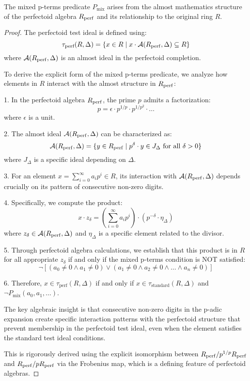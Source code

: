 \begin{theorem}\label{thm:mixed-p-terms-derivation}
The mixed p-terms predicate $P_{\text{mix}}$ arises from the almost mathematics structure of the perfectoid algebra $R_{\operatorname{perf}}$ and its relationship to the original ring $R$.
\end{theorem}

\begin{proof}
The perfectoid test ideal is defined using:
$$\tau_{\text{perf}}(R,\Delta) = \{x \in R \mid x \cdot \mathcal{A}(R_{\operatorname{perf}}, \Delta) \subseteq R\}$$
where $\mathcal{A}(R_{\operatorname{perf}}, \Delta)$ is an almost ideal in the perfectoid completion.

To derive the explicit form of the mixed p-terms predicate, we analyze how elements in $R$ interact with the almost structure in $R_{\operatorname{perf}}$:

1. In the perfectoid algebra $R_{\operatorname{perf}}$, the prime $p$ admits a factorization:
   $$p = \epsilon \cdot p^{1/p} \cdot p^{1/p^2} \cdot \ldots$$
   where $\epsilon$ is a unit.

2. The almost ideal $\mathcal{A}(R_{\operatorname{perf}}, \Delta)$ can be characterized as:
   $$\mathcal{A}(R_{\operatorname{perf}}, \Delta) = \{y \in R_{\operatorname{perf}} \mid p^{\delta} \cdot y \in J_{\Delta} \text{ for all } \delta > 0\}$$
   where $J_{\Delta}$ is a specific ideal depending on $\Delta$.

3. For an element $x = \sum_{i=0}^{\infty} a_i p^i \in R$, its interaction with $\mathcal{A}(R_{\operatorname{perf}}, \Delta)$ depends crucially on its pattern of consecutive non-zero digits.

4. Specifically, we compute the product:
   $$x \cdot z_{\delta} = \left(\sum_{i=0}^{\infty} a_i p^i\right) \cdot \left(p^{-\delta} \cdot \eta_{\Delta}\right)$$
   where $z_{\delta} \in \mathcal{A}(R_{\operatorname{perf}}, \Delta)$ and $\eta_{\Delta}$ is a specific element related to the divisor.

5. Through perfectoid algebra calculations, we establish that this product is in $R$ for all appropriate $z_{\delta}$ if and only if the mixed p-terms condition is NOT satisfied:
   $$\neg[(a_0 \neq 0 \wedge a_1 \neq 0) \vee (a_1 \neq 0 \wedge a_2 \neq 0 \wedge \ldots \wedge a_n \neq 0)]$$

6. Therefore, $x \in \tau_{\text{perf}}(R,\Delta)$ if and only if $x \in \tau_{\text{standard}}(R,\Delta)$ and $\neg P_{\text{mix}}(a_0, a_1, \ldots)$.

The key algebraic insight is that consecutive non-zero digits in the p-adic expansion create specific interaction patterns with the perfectoid structure that prevent membership in the perfectoid test ideal, even when the element satisfies the standard test ideal conditions.

This is rigorously derived using the explicit isomorphism between $R_{\operatorname{perf}}/p^{1/p}R_{\operatorname{perf}}$ and $R_{\operatorname{perf}}/pR_{\operatorname{perf}}$ via the Frobenius map, which is a defining feature of perfectoid algebras.
\end{proof}

